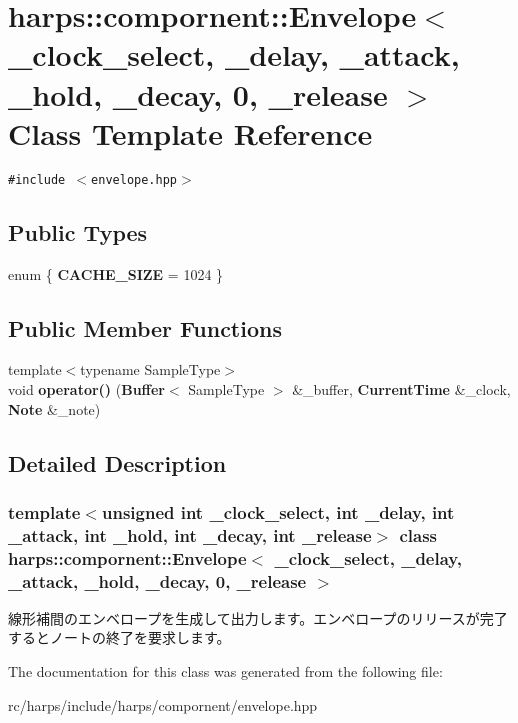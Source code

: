 \section{harps::compornent::Envelope$<$ \_\-clock\_\-select, \_\-delay, \_\-attack, \_\-hold, \_\-decay, 0, \_\-release $>$ Class Template Reference}
\label{classharps_1_1compornent_1_1Envelope_3_01__clock__select_00_01__delay_00_01__attack_00_01__hold_396210224e615d03f376f3377e02eb68}
{\tt \#include $<$envelope.hpp$>$}

\subsection*{Public Types}
\begin{CompactItemize}
\item 
enum \{ \textbf{CACHE\_\-SIZE} =  1024
 \}
\end{CompactItemize}
\subsection*{Public Member Functions}
\begin{CompactItemize}
\item 
{\footnotesize template$<$typename SampleType$>$ }\\void \textbf{operator()} ({\bf Buffer}$<$ SampleType $>$ \&\_\-buffer, {\bf CurrentTime} \&\_\-clock, {\bf Note} \&\_\-note)\label{classharps_1_1compornent_1_1Envelope_3_01__clock__select_00_01__delay_00_01__attack_00_01__hold_396210224e615d03f376f3377e02eb68_50dec6a5f4ad7e503e6a31c57dbe6539}

\end{CompactItemize}


\subsection{Detailed Description}
\subsubsection*{template$<$unsigned int \_\-clock\_\-select, int \_\-delay, int \_\-attack, int \_\-hold, int \_\-decay, int \_\-release$>$ class harps::compornent::Envelope$<$ \_\-clock\_\-select, \_\-delay, \_\-attack, \_\-hold, \_\-decay, 0, \_\-release $>$}

線形補間のエンベロープを生成して出力します。エンベロープのリリースが完了するとノートの終了を要求します。 

The documentation for this class was generated from the following file:\begin{CompactItemize}
\item 
rc/harps/include/harps/compornent/envelope.hpp\end{CompactItemize}
